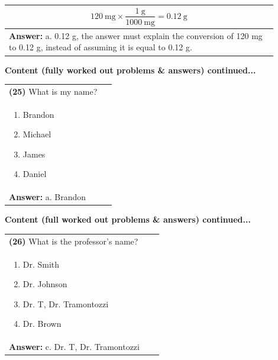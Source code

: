\documentclass{article}
\begin{document}
{{{{\begin{tabular}{|p{0.9\linewidth}|}
\[
120~\text{mg} \times \frac{1~\text{g}}{1000~\text{mg}} = 0.12~\text{g} 
\] \\ 
\hline
\vspace{0.2cm}
\textbf{Answer:} a. 0.12 g, the answer must explain the conversion of 120 mg to 0.12 g, instead of assuming it is equal to 0.12 g. \\
\hline
\end{tabular}

\newpage
\noindent
{\large\textbf{Content (fully worked out problems \& answers) continued...}\\[0.2em]
\vspace{0.2cm}
\begin{tabular}{|p{0.9\linewidth}|}
\hline
\vspace{0.2cm}
\textbf{(25)} What is my name?\\
\begin{minipage}[t]{0.85\linewidth}
\begin{enumerate}[label=\alph*.]
   \item Brandon
   \item Michael
   \item James
   \item Daniel
\end{enumerate}
\end{minipage}\\
\hline
\vspace{0.2cm}
\textbf{Answer:} a. Brandon\\
\hline
\end{tabular}
\newpage


\noindent
{\large\textbf{Content (full worked out problems \& answers) continued...}\\[0.2em]
\vspace{0.2cm}
\begin{tabular}{|p{0.9\linewidth}|}
\hline
\vspace{0.2cm}
\textbf{(26)} What is the professor's name?\\
\begin{minipage}[t]{0.85\linewidth}
\begin{enumerate}[label=\alph*.]
   \item Dr. Smith
   \item Dr. Johnson
   \item Dr. T, Dr. Tramontozzi
   \item Dr. Brown
\end{enumerate}
\end{minipage}\\
\hline
\vspace{0.2cm}
\textbf{Answer:} c. Dr. T, Dr. Tramontozzi\\
\hline
\end{tabular}
\newpage

}}}}}}
\end{document}
